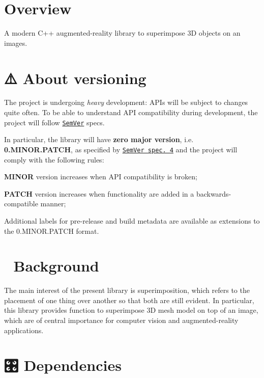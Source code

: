 \hypertarget{index_overview}{}\section{Overview}\label{index_overview}
A modern C++ augmented-\/reality library to superimpose 3D objects on an images.\hypertarget{index_versioning}{}\section{⚠️ About versioning}\label{index_versioning}


 The project is undergoing {\itshape heavy} development\+: A\+P\+Is will be subject to changes quite often. To be able to understand A\+PI compatibility during development, the project will follow \href{http://semver.org/}{\tt Sem\+Ver} specs.

In particular, the library will have {\bfseries zero major version}, i.\+e. {\bfseries 0.\+M\+I\+N\+O\+R.\+P\+A\+T\+CH}, as specified by \href{http://semver.org/#spec-item-4}{\tt Sem\+Ver spec. 4} and the project will comply with the following rules\+:
\begin{DoxyEnumerate}
\item {\bfseries M\+I\+N\+OR} version increases when A\+PI compatibility is broken;
\item {\bfseries P\+A\+T\+CH} version increases when functionality are added in a backwards-\/compatible manner;
\item Additional labels for pre-\/release and build metadata are available as extensions to the 0.\+M\+I\+N\+O\+R.\+P\+A\+T\+CH format.
\end{DoxyEnumerate}\hypertarget{index_background}{}\section{📖 Background}\label{index_background}


 The main interest of the present library is superimposition, which refers to the placement of one thing over another so that both are still evident. In particular, this library provides function to superimpose 3D mesh model on top of an image, which are of central importance for computer vision and augmented-\/reality applications.\hypertarget{index_dependencies}{}\section{🎛 Dependencies}\label{index_dependencies}


